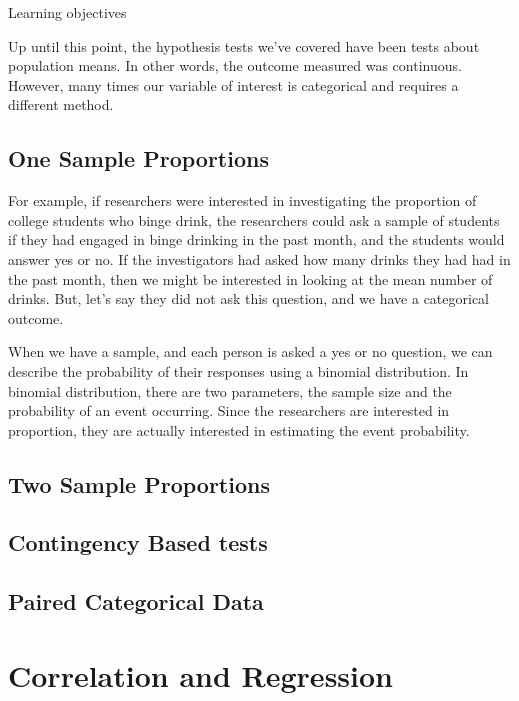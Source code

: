 \documentclass[
]{book}
\theoremstyle{definition}
\theoremstyle{definition}
\theoremstyle{definition}
\theoremstyle{remark}
\begin{document}
Learning objectives

Up until this point, the hypothesis tests we've covered have been tests about population means. In other words, the outcome measured was continuous. However, many times our variable of interest is categorical and requires a different method.

\hypertarget{ch10_s1}{%
\section{One Sample Proportions}\label{ch10_s1}}

For example, if researchers were interested in investigating the proportion of college students who binge drink, the researchers could ask a sample of students if they had engaged in binge drinking in the past month, and the students would answer yes or no. If the investigators had asked how many drinks they had had in the past month, then we might be interested in looking at the mean number of drinks. But, let's say they did not ask this question, and we have a categorical outcome.

When we have a sample, and each person is asked a yes or no question, we can describe the probability of their responses using a binomial distribution. In binomial distribution, there are two parameters, the sample size and the probability of an event occurring. Since the researchers are interested in proportion, they are actually interested in estimating the event probability.

\hypertarget{ch10_s2}{%
\section{Two Sample Proportions}\label{ch10_s2}}

\hypertarget{ch10_s3}{%
\section{Contingency Based tests}\label{ch10_s3}}

\hypertarget{ch10_s4}{%
\section{Paired Categorical Data}\label{ch10_s4}}

\hypertarget{ch11}{%
\chapter{Correlation and Regression}\label{ch11}}
\end{document}
